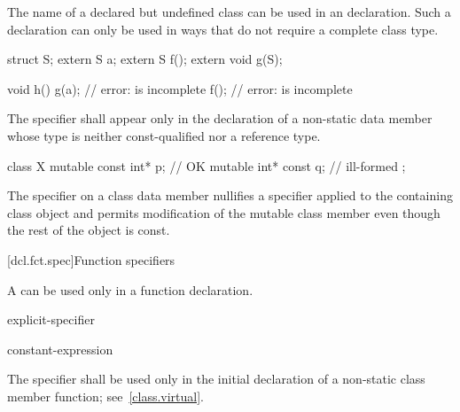 \pnum
{}%
The name of a declared but undefined class can be used in an
 declaration. Such a declaration can only be used in ways
that do not require a complete class type.
\begin{example}
\begin{codeblock}
struct S;
extern S a;
extern S f();
extern void g(S);

void h() {
  g(a);                         // error:  is incomplete
  f();                          // error:  is incomplete
}
\end{codeblock}
\end{example}

\pnum
The  specifier shall appear only in the declaration of
a non-static data member
whose type is neither const-qualified nor a reference type.
\begin{example}
\begin{codeblock}
class X {
  mutable const int* p;         // OK
  mutable int* const q;         // ill-formed
};
\end{codeblock}
\end{example}

\pnum
The  specifier on a class data member nullifies a
 specifier applied to the containing class object and
permits modification of the mutable class member even though the rest of
the object is const.

[dcl.fct.spec]{Function specifiers}%
%

\pnum
A
can be used only in a function declaration.

\begin{bnf}
\br
    \br
    explicit-specifier
\end{bnf}

\begin{bnf}
\br
     \terminal{(} constant-expression \terminal{)}\br
\end{bnf}

\pnum
{}%
The  specifier shall be used only in the initial
declaration of a non-static class member function;
see~\ref{class.virtual}.


